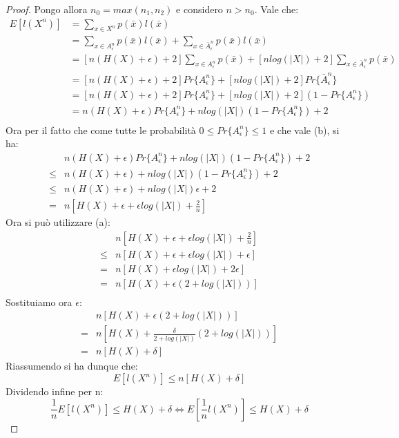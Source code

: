 \begin{teorema}
\begin{proof}
\noindent
Pongo allora $n_0=max(n_1,n_2)$ e considero $n>n_0$.
Vale che:
\[\begin{split}
 E \left [ l(X^n) \right]&=\sum_{x \in X^n} p(\bar{x})l(\bar{x}) \\
 &=\sum_{x \in A_{\epsilon}^n} p(\bar{x})l(\bar{x})  + \sum_{x \in \bar{A}_{\epsilon}^n} p(\bar{x})l(\bar{x}) \\
 &= [n(H(X)+\epsilon)+2]\sum_{x \in A_{\epsilon}^n} p(\bar{x}) + [nlog(|X|)+2]\sum_{x \in \bar{A}_{\epsilon}^n} p(\bar{x}) \\
 &= [n(H(X)+\epsilon)+2] Pr\{A_{\epsilon}^n\} + [nlog(|X|)+2] Pr\{\bar{A}_{\epsilon}^n\} \\
 &= [n(H(X)+\epsilon)+2] Pr\{A_{\epsilon}^n\} + [nlog(|X|)+2] (1-Pr\{A_{\epsilon}^n\}) \\
 &=n(H(X)+\epsilon)Pr\{A_{\epsilon}^n\} + nlog(|X|)(1-Pr\{A_{\epsilon}^n\}) + 2\\
 \end{split}
\]
Ora per il fatto che come tutte le probabilità $0 \le Pr\{A_{\epsilon}^n\} \le 1$ e che vale (b), si ha:
\[\begin{split}
  &n(H(X)+\epsilon)Pr\{A_{\epsilon}^n\} + nlog(|X|)(1-Pr\{A_{\epsilon}^n\}) + 2\\
  \le &n(H(X)+\epsilon) + nlog(|X|)(1-Pr\{A_{\epsilon}^n\}) + 2\\
  \le& n(H(X)+\epsilon) +n log(|X|)\epsilon + 2 \\
   =&n[H(X)+\epsilon+\epsilon log(|X|) + \frac{2}{n}]
  \end{split}
\]
Ora si può utilizzare (a):
\[\begin{split}
   &n[H(X)+\epsilon+\epsilon log(|X|) +\frac{2}{n}]  \\
  \le & n[H(X)+\epsilon+\epsilon log(|X|) +\epsilon]  \\
  =& n[H(X)+\epsilon log(|X|) +2\epsilon]  \\
  =& n[H(X)+\epsilon ( 2+ log(|X|))]  \\
  \end{split}
\]
Sostituiamo ora $\epsilon$:
\[\begin{split}
 & n[H(X)+\epsilon ( 2+log(|X|) )]  \\
 =&n[H(X)+ \frac{\delta}{2+log(|X|)} ( 2+log(|X|) )] \\
 =&n[H(X)+ \delta]
 \end{split}
\]
Riassumendo si ha dunque che:
\[
 E \left [ l(X^n) \right] \le n[H(X)+ \delta]
\]
Dividendo infine per n:
\[
 \frac{1}{n} E \left [ l(X^n) \right] \le H(X)+ \delta \iff E \left [ \frac{1}{n} l(X^n) \right] \le H(X)+ \delta
\]


\end{proof}
\end{teorema}

